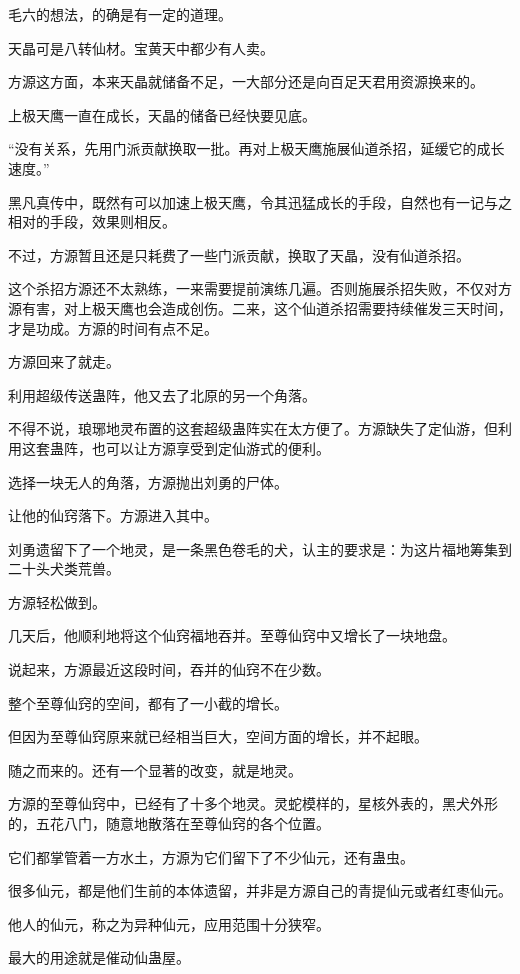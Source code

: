 \begin{this_body}
毛六的想法，的确是有一定的道理。

天晶可是八转仙材。宝黄天中都少有人卖。

方源这方面，本来天晶就储备不足，一大部分还是向百足天君用资源换来的。

上极天鹰一直在成长，天晶的储备已经快要见底。

“没有关系，先用门派贡献换取一批。再对上极天鹰施展仙道杀招，延缓它的成长速度。”

黑凡真传中，既然有可以加速上极天鹰，令其迅猛成长的手段，自然也有一记与之相对的手段，效果则相反。

不过，方源暂且还是只耗费了一些门派贡献，换取了天晶，没有仙道杀招。

这个杀招方源还不太熟练，一来需要提前演练几遍。否则施展杀招失败，不仅对方源有害，对上极天鹰也会造成创伤。二来，这个仙道杀招需要持续催发三天时间，才是功成。方源的时间有点不足。

方源回来了就走。

利用超级传送蛊阵，他又去了北原的另一个角落。

不得不说，琅琊地灵布置的这套超级蛊阵实在太方便了。方源缺失了定仙游，但利用这套蛊阵，也可以让方源享受到定仙游式的便利。

选择一块无人的角落，方源抛出刘勇的尸体。

让他的仙窍落下。方源进入其中。

刘勇遗留下了一个地灵，是一条黑色卷毛的犬，认主的要求是：为这片福地筹集到二十头犬类荒兽。

方源轻松做到。

几天后，他顺利地将这个仙窍福地吞并。至尊仙窍中又增长了一块地盘。

说起来，方源最近这段时间，吞并的仙窍不在少数。

整个至尊仙窍的空间，都有了一小截的增长。

但因为至尊仙窍原来就已经相当巨大，空间方面的增长，并不起眼。

随之而来的。还有一个显著的改变，就是地灵。

方源的至尊仙窍中，已经有了十多个地灵。灵蛇模样的，星核外表的，黑犬外形的，五花八门，随意地散落在至尊仙窍的各个位置。

它们都掌管着一方水土，方源为它们留下了不少仙元，还有蛊虫。

很多仙元，都是他们生前的本体遗留，并非是方源自己的青提仙元或者红枣仙元。

他人的仙元，称之为异种仙元，应用范围十分狭窄。

最大的用途就是催动仙蛊屋。


\end{this_body}
